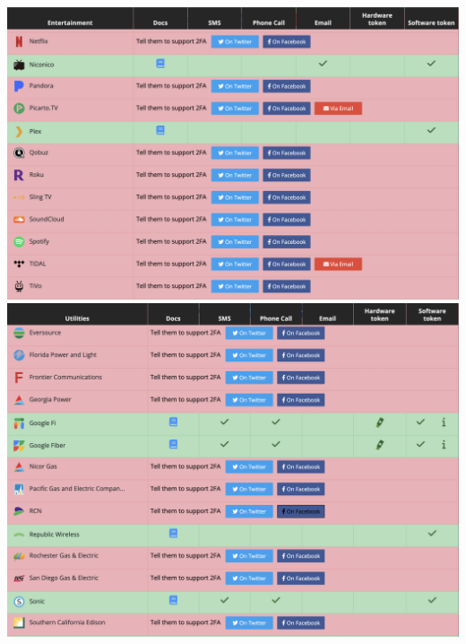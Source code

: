\documentclass{article}
\begin{document}
\begin{center}
    \includegraphics[scale=.25]{images/2fa1.png}
    \includegraphics[scale=.25]{images/2fa2.png}
\end{center}
\end{document}
